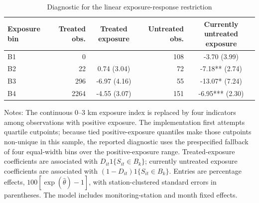 \begin{table}[!htbp]
\centering
\begin{threeparttable}
\caption{Diagnostic for the linear exposure-response restriction}
\label{tab:ulez_exposure_bins}
\begin{tabular}{lrcrc}
\toprule
Exposure bin & Treated obs. & Treated exposure & Untreated obs. & Currently untreated exposure \\
\midrule
B1 & 0 &  & 108 & -3.70 (3.99) \\
B2 & 22 & 0.74 (3.04) & 72 & -7.18** (2.74) \\
B3 & 296 & -6.97 (4.16) & 55 & -13.07* (7.24) \\
B4 & 2264 & -4.55 (3.07) & 151 & -6.95*** (2.30) \\
\bottomrule
\end{tabular}
\begin{tablenotes}[flushleft]
\footnotesize
\item Notes: The continuous 0--3 km exposure index is replaced by four indicators among observations with positive exposure. The implementation first attempts quartile cutpoints; because tied positive-exposure quantiles make those cutpoints non-unique in this sample, the reported diagnostic uses the prespecified fallback of four equal-width bins over the positive-exposure range. Treated-exposure coefficients are associated with $D_{it}1\{S_{it}\in B_k\}$; currently untreated exposure coefficients are associated with $(1-D_{it})1\{S_{it}\in B_k\}$. Entries are percentage effects, $100[\exp(\widehat\theta)-1]$, with station-clustered standard errors in parentheses. The model includes monitoring-station and month fixed effects.
\end{tablenotes}
\end{threeparttable}
\end{table}
